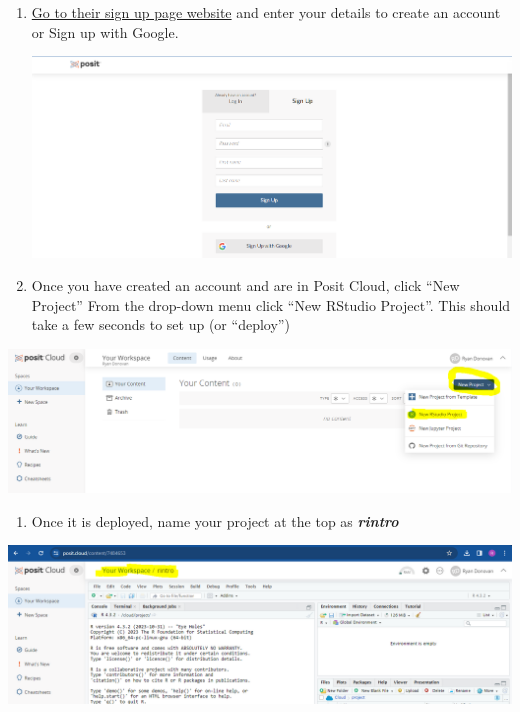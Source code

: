 \documentclass[
]{book}
\providecommand{\tightlist}{%
  \setlength{\itemsep}{0pt}\setlength{\parskip}{0pt}}
\begin{document}
\begin{enumerate}
\def\labelenumi{\arabic{enumi}.}
\item
  \href{https://login.posit.cloud/register?redirect=\%2Foauth\%2Fauthorize\%3Fredirect_uri\%3Dhttps\%253A\%252F\%252Fposit.cloud\%252Flogin\%26client_id\%3Dposit-cloud\%26response_type\%3Dcode\%26show_auth\%3D0}{Go to their sign up page website} and enter your details to create an account or Sign up with Google.

  \includegraphics{img/01-posit-sign-up.png}
\item
  Once you have created an account and are in Posit Cloud, click ``New Project'' From the drop-down menu click ``New RStudio Project''. This should take a few seconds to set up (or ``deploy'')
\end{enumerate}

\includegraphics{img/01-posit-newproject.png}

\begin{enumerate}
\def\labelenumi{\arabic{enumi}.}
\tightlist
\item
  Once it is deployed, name your project at the top as \textbf{\emph{rintro}}
\end{enumerate}

\includegraphics{img/01-posit-rintro.png}
\end{document}
